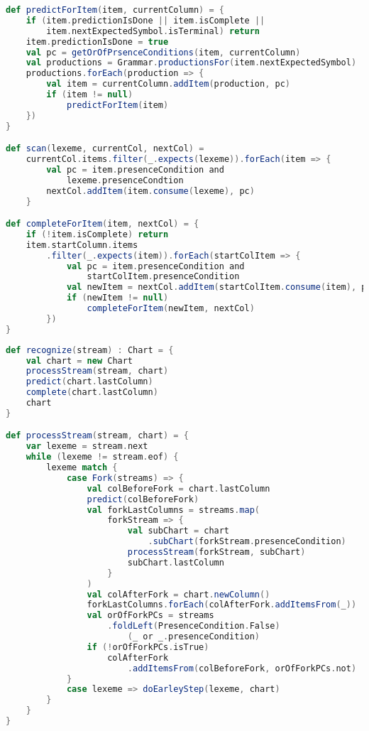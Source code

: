 \begin{minipage}{\linewidth}
\begin{lstlisting}[caption={Псевдокод модифицированных процедур алгоритма Earley},language=Scala,label=modearleyprocs]
def predictForItem(item, currentColumn) = {
	if (item.predictionIsDone || item.isComplete || 
		item.nextExpectedSymbol.isTerminal) return
	item.predictionIsDone = true
	val pc = getOrOfPrsenceConditions(item, currentColumn)
	val productions = Grammar.productionsFor(item.nextExpectedSymbol)
	productions.forEach(production => {
		val item = currentColumn.addItem(production, pc)
		if (item != null)
			predictForItem(item)
	})
}

def scan(lexeme, currentCol, nextCol) = 
	currentCol.items.filter(_.expects(lexeme)).forEach(item => {
		val pc = item.presenceCondition and
			lexeme.presenceCondtion
		nextCol.addItem(item.consume(lexeme), pc)
	}

def completeForItem(item, nextCol) = {
	if (!item.isComplete) return
	item.startColumn.items
		.filter(_.expects(item)).forEach(startColItem => {
			val pc = item.presenceCondition and 
				startColItem.presenceCondition
			val newItem = nextCol.addItem(startColItem.consume(item), pc)
			if (newItem != null)
				completeForItem(newItem, nextCol)		
		})
}
\end{lstlisting}
\end{minipage}

\begin{minipage}{\linewidth}
\begin{lstlisting}[caption={Псевдокод алгоритма распознавания},language=Scala,label=recognitionpseudocode]
def recognize(stream) : Chart = {
	val chart = new Chart
	processStream(stream, chart)
	predict(chart.lastColumn)
	complete(chart.lastColumn)
	chart
}

def processStream(stream, chart) = {
	var lexeme = stream.next
	while (lexeme != stream.eof) {
		lexeme match {
			case Fork(streams) => {
				val colBeforeFork = chart.lastColumn
				predict(colBeforeFork)
				val forkLastColumns = streams.map(
					forkStream => {
						val subChart = chart
							.subChart(forkStream.presenceCondition)
						processStream(forkStream, subChart)
						subChart.lastColumn
					}
				)
				val colAfterFork = chart.newColumn()
				forkLastColumns.forEach(colAfterFork.addItemsFrom(_))
				val orOfForkPCs = streams
					.foldLeft(PresenceCondition.False) 
						(_ or _.presenceCondition)
				if (!orOfForkPCs.isTrue) 
					colAfterFork
						.addItemsFrom(colBeforeFork, orOfForkPCs.not)
			}
			case lexeme => doEarleyStep(lexeme, chart)
		}
	}
}

\end{lstlisting}
\end{minipage}

